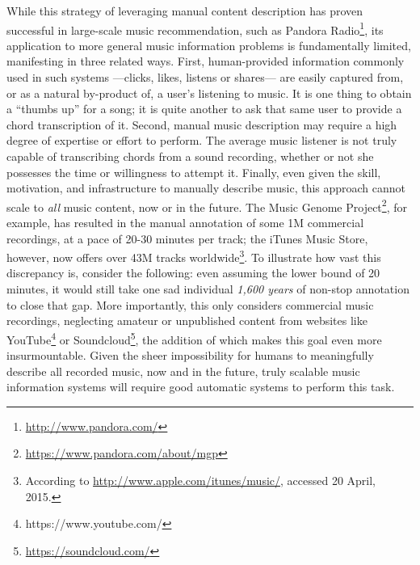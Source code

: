 While this strategy of leveraging manual content description has proven successful in large-scale music recommendation, such as Pandora Radio\footnote{\url{http://www.pandora.com/}}, its application to more general music information problems is fundamentally limited, manifesting in three related ways.
First, human-provided information commonly used in such systems ---clicks, likes, listens or shares--- are easily captured from, or as a natural by-product of, a user's listening to music.
It is one thing to obtain a ``thumbs up'' for a song; it is quite another to ask that same user to provide a chord transcription of it.
Second, manual music description may require a high degree of expertise or effort to perform.
The average music listener is not truly capable of transcribing chords from a sound recording, whether or not she possesses the time or willingness to attempt it.
Finally, even given the skill, motivation, and infrastructure to manually describe music, this approach cannot scale to \emph{all} music content, now or in the future.
The Music Genome Project\footnote{\url{https://www.pandora.com/about/mgp}}, for example, has resulted in the manual annotation of some 1M commercial recordings, at a pace of 20-30 minutes per track;
the iTunes Music Store, however, now offers over 43M tracks worldwide\footnote{According to \url{http://www.apple.com/itunes/music/}, accessed 20 April, 2015.}.
To illustrate how vast this discrepancy is, consider the following: even assuming the lower bound of 20 minutes, it would still take one sad individual \emph{1,600 years} of non-stop annotation to close that gap.
More importantly, this only considers commercial music recordings, neglecting amateur or unpublished content from websites like YouTube\footnote{https://www.youtube.com/} or Soundcloud\footnote{\url{https://soundcloud.com/}}, the addition of which makes this goal even more insurmountable.
Given the sheer impossibility for humans to meaningfully describe all recorded music, now and in the future, truly scalable music information systems will require good automatic systems to perform this task.

